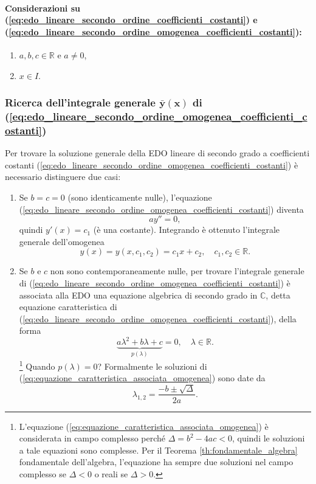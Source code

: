 \paragraph{Considerazioni su (\ref{eq:edo_lineare_secondo_ordine_coefficienti_costanti}) e (\ref{eq:edo_lineare_secondo_ordine_omogenea_coefficienti_costanti}):}
\begin{enumerate}
	\item $a,b,c \in\mathbb{R}$ e $a\neq 0$,
	\item $x\in I$.
\end{enumerate}

\subsubsection{Ricerca dell'integrale generale \texorpdfstring{$\boldsymbol{\bar y(x)}$}{y(x)} di (\ref{eq:edo_lineare_secondo_ordine_omogenea_coefficienti_costanti})}
Per trovare la soluzione generale della EDO lineare di secondo grado a coefficienti costanti (\ref{eq:edo_lineare_secondo_ordine_omogenea_coefficienti_costanti}) è necessario distinguere due casi:
\begin{enumerate}
	\item Se $b=c=0$ (sono identicamente nulle), l'equazione (\ref{eq:edo_lineare_secondo_ordine_omogenea_coefficienti_costanti}) diventa
	\begin{equation*}
		a y''=0,
	\end{equation*}
	quindi $y'(x)=c_1$ (è una costante). Integrando è ottenuto l'integrale generale dell'omogenea
	\begin{equation*}
		y(x)=y(x,c_1,c_2) 
		= c_1 x+c_2,\quad c_1,c_2\in\mathbb{R}.
	\end{equation*}
	\item Se $b$ e $c$ non sono contemporaneamente nulle, per trovare l'integrale generale di (\ref{eq:edo_lineare_secondo_ordine_omogenea_coefficienti_costanti}) è associata alla EDO una equazione algebrica di secondo grado in $\mathbb{C}$, detta equazione caratteristica di (\ref{eq:edo_lineare_secondo_ordine_omogenea_coefficienti_costanti}), della forma
	\begin{equation}\label{eq:equazione_caratteristica_associata_omogenea}
		\underbrace{a\lambda^2 + b\lambda + c}_{p(\lambda)} = 0,\quad\lambda\in\mathbb{R}.
	\end{equation}
	\footnote{L'equazione (\ref{eq:equazione_caratteristica_associata_omogenea}) è considerata in campo complesso perché $\Delta = b^2-4ac<0$, quindi le soluzioni a tale equazioni sono complesse. Per il Teorema \ref{th:fondamentale_algebra} fondamentale dell'algebra, l'equazione ha sempre due soluzioni nel campo complesso se $\Delta<0$ o reali se $\Delta>0$.} Quando $p(\lambda)=0$? Formalmente le soluzioni di (\ref{eq:equazione_caratteristica_associata_omogenea}) sono date da
	\begin{equation*}
		\lambda_{1,2} = \frac{-b\pm\sqrt{\Delta}}{2a}.
	\end{equation*}
\end{enumerate}

